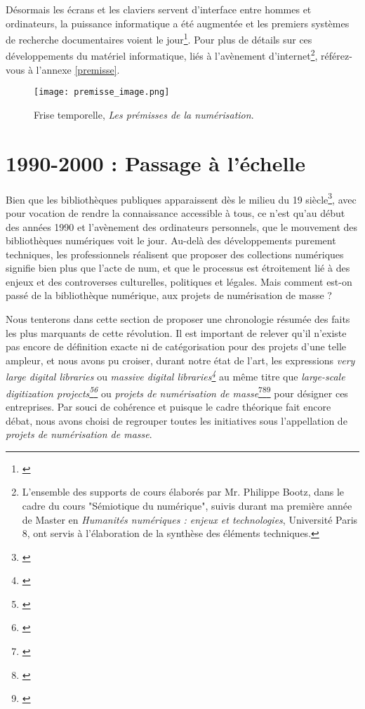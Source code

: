 Désormais les écrans et les claviers servent d'interface entre hommes et ordinateurs, la puissance informatique a été augmentée et les premiers systèmes de recherche documentaires voient le jour\footnote{\cite[p. 10]{weiss_using_2014}}. Pour plus de détails sur ces développements du matériel informatique, liés à l'avènement d'internet\footnote{L'ensemble des supports de cours élaborés par Mr. Philippe Bootz, dans le cadre du cours "Sémiotique du numérique", suivis durant ma première année de Master en \textit{Humanités numériques : enjeux et technologies}, Université Paris 8, ont servis à l'élaboration de la synthèse des éléments techniques.}, référez-vous à l'annexe \ref{premisse}. 
\newpage

\begin{figure}[H]%
\texttt{[image: premisse\_image.png]}
\caption{Frise temporelle, \textit{Les prémisses de la numérisation}.}
\end{figure}
\newpage

\section{1990-2000 : Passage à l'échelle}\label{echelle}
Bien que les bibliothèques publiques apparaissent dès le milieu du 19 siècle\footnote{\cite[p.230]{jones_public_2017}}, avec pour vocation de rendre la connaissance accessible à tous, ce n'est qu'au début des années 1990 et l'avènement des ordinateurs personnels, que le mouvement des bibliothèques numériques voit le jour. Au-delà des développements purement techniques, les professionnels réalisent que proposer des collections numériques signifie bien plus que l'acte de \gls{num}, et que le processus est étroitement lié à des enjeux et des controverses culturelles, politiques et légales. Mais comment est-on passé de la bibliothèque numérique, aux projets de numérisation de masse ? 

Nous tenterons dans cette section de proposer une chronologie résumée des faits les plus marquants de cette révolution. Il est important de relever qu'il n'existe pas encore de définition exacte ni de catégorisation pour des projets d'une telle ampleur, et nous avons pu croiser, durant notre état de l'art, les expressions \textit{very large digital libraries} ou \textit{massive digital libraries\footnote{\cite{weiss_using_2014}}} au même titre que \textit{large-scale digitization projects\footnote{\cite[p.47]{lampert_ramping_2018}}\footnote{\cite{yeates_collaborative_2006}}} ou \textit{projets de numérisation de masse}\footnote{\cite{thylstrup_politics_2018}}\footnote{\cite{lampert_ramping_2018}}\footnote{\cite{xie_discover_2016}} pour désigner ces entreprises. Par souci de cohérence et puisque le cadre théorique fait encore débat, nous avons choisi de regrouper toutes les initiatives sous l'appellation de \textit{projets de numérisation de masse}.

